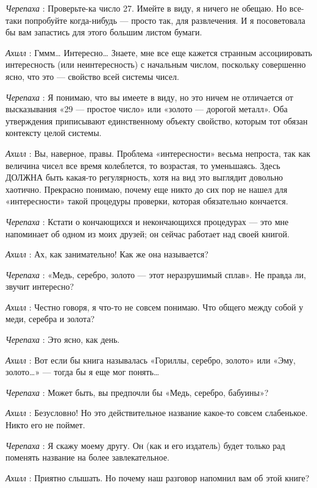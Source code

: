 \documentclass[../main.tex]{subfiles}
\begin{document}
\begin{dialogue}
\emph{Черепаха} : Проверьте-ка число 27. Имейте в виду, я ничего не обещаю. Но все-таки попробуйте когда-нибудь --- просто так, для развлечения. И я посоветовала бы вам запастись для этого большим листом бумаги.

\emph{Ахилл} : Гммм\ldots{} Интересно\ldots{} Знаете, мне все еще кажется странным ассоциировать интересность (или неинтересность) с начальным числом, поскольку совершенно ясно, что это --- свойство всей системы чисел.

\emph{Черепаха} : Я понимаю, что вы имеете в виду, но это ничем не отличается от высказывания «29 --- простое число» или «золото --- дорогой металл». Оба утверждения приписывают единственному объекту свойство, которым тот обязан контексту целой системы.

\emph{Ахилл} : Вы, наверное, правы. Проблема «интересности» весьма непроста, так как величина чисел все время колеблется, то возрастая, то уменьшаясь. Здесь ДОЛЖНА быть какая-то регулярность, хотя на вид это выглядит довольно хаотично. Прекрасно понимаю, почему еще никто до сих пор не нашел для «интересности» такой процедуры проверки, которая обязательно кончается.

\emph{Черепаха} : Кстати о кончающихся и некончающихся процедурах --- это мне напоминает об одном из моих друзей; он сейчас работает над своей книгой.

\emph{Ахилл} : Ах, как занимательно! Как же она называется?

\emph{Черепаха} : «Медь, серебро, золото --- этот неразрушимый сплав». Не правда ли, звучит интересно?

\emph{Ахилл} : Честно говоря, я что-то не совсем понимаю. Что общего между собой у меди, серебра и золота?

\emph{Черепаха} : Это ясно, как день.

\emph{Ахилл} : Вот если бы книга называлась «Гориллы, серебро, золото» или «Эму, золото\ldots» --- тогда бы я еще мог понять\ldots{}

\emph{Черепаха} : Может быть, вы предпочли бы «Медь, серебро, бабуины»?

\emph{Ахилл} : Безусловно! Но это действительное название какое-то совсем слабенькое. Никто его не поймет.

\emph{Черепаха} : Я скажу моему другу. Он (как и его издатель) будет только рад поменять название на более завлекательное.

\emph{Ахилл} : Приятно слышать. Но почему наш разговор напомнил вам об этой книге?


\end{dialogue}
\end{document}
